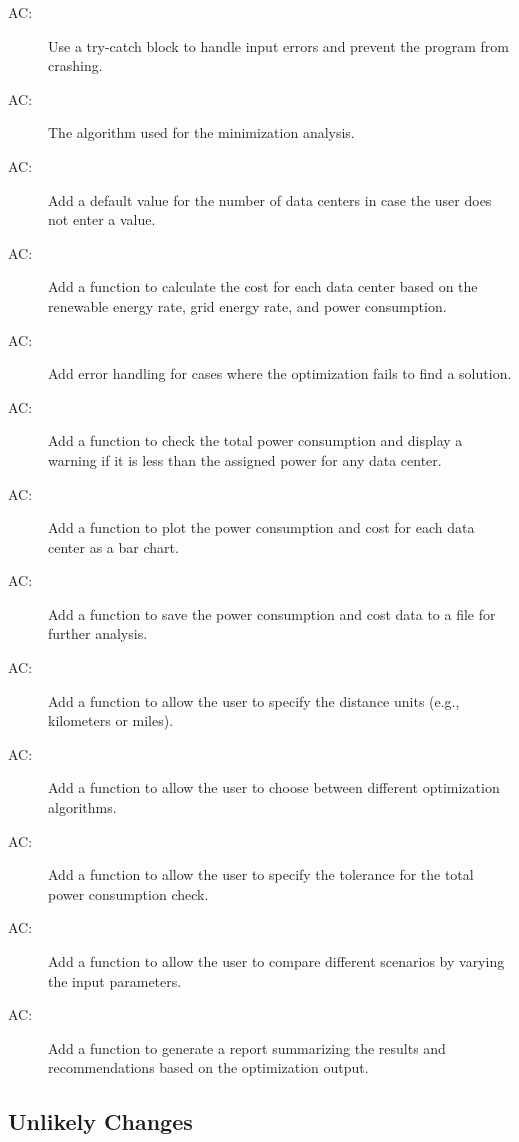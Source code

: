 \documentclass[12pt]{article}
\newcounter{acnum}
\newcommand{\actheacnum}{AC\theacnum}
\begin{document}
\begin{description}
\item[ \actheacnum \label{acSeqDS}:]Use a try-catch block to handle input errors and prevent the program from crashing.
\item[ \actheacnum \label{acSolver}:] The algorithm used
  for the minimization analysis.
\item[ \actheacnum \label{acPlot}:] Add a default value for the number of data centers in case the user does not enter a value.
\item[ \actheacnum \label{ac4}:] Add a function to calculate the cost for each data center based on the renewable energy rate, grid energy rate, and power consumption.
\item[ \actheacnum \label{ac5}:] Add error handling for cases where the optimization fails to find a solution.
\item[ \actheacnum \label{ac6}:] Add a function to check the total power consumption and display a warning if it is less than the assigned power for any data center.
\item[ \actheacnum \label{ac7}:] Add a function to plot the power consumption and cost for each data center as a bar chart.
\item[ \actheacnum \label{ac8}:] Add a function to save the power consumption and cost data to a file for further analysis.
\item[ \actheacnum \label{ac9}:] Add a function to allow the user to specify the distance units (e.g., kilometers or miles).
\item[ \actheacnum \label{ac10}:] Add a function to allow the user to choose between different optimization algorithms.
\item[ \actheacnum \label{ac11}:] Add a function to allow the user to specify the tolerance for the total power consumption check.
\item[ \actheacnum \label{ac12}:] Add a function to allow the user to compare different scenarios by varying the input parameters.
\item[ \actheacnum \label{ac13}:] Add a function to generate a report summarizing the results and recommendations based on the optimization output.
\end{description}

\subsection{Unlikely Changes} \label{SecUchange}
\end{document}
